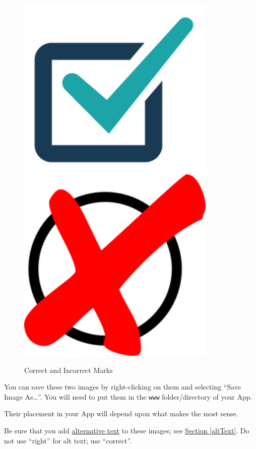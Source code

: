 \documentclass[
]{book}
\begin{document}
\begin{figure}

{\centering \includegraphics[width=3.75in]{images/check} \includegraphics[width=3.75in]{images/cross} 

}

\caption{Correct and Incorrect Marks}\label{fig:marks}
\end{figure}

You can save these two images by right-clicking on them and selecting ``Save Image As\ldots{}''. You will need to put them in the \texttt{www} folder/directory of your App.

Their placement in your App will depend upon what makes the most sense.

Be sure that you add \protect\hyperlink{altText}{alternative text} to these images; see \protect\hyperlink{altText}{Section \ref{altText}}. Do not use ``right'' for alt text; use ``correct''.
\end{document}
